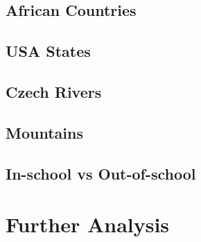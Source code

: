 \subsection*{African Countries}

\subsection*{USA States}

\subsection*{Czech Rivers}

\subsection*{Mountains}

\subsection*{In-school vs Out-of-school}

\section{Further Analysis}
\label{further-analysis}
